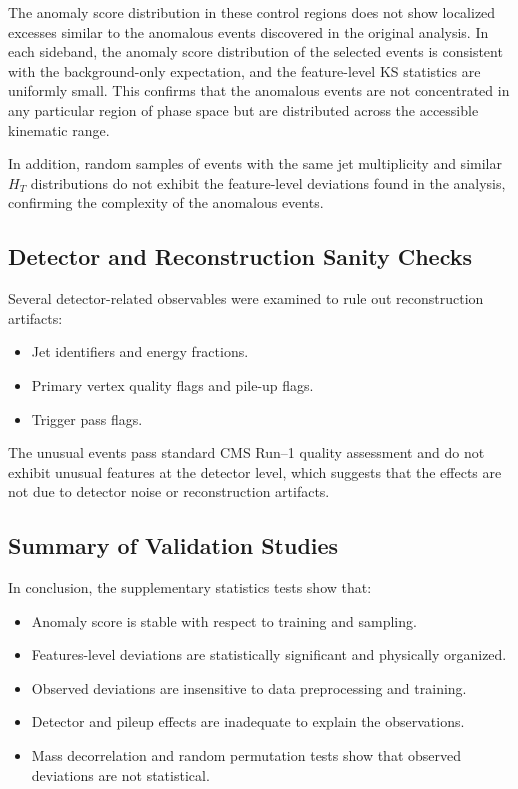 \documentclass[11pt,a4paper,twocolumn]{article}
\begin{document}
The anomaly score distribution in these control regions does not show localized excesses similar to the anomalous events discovered in the original analysis. In each sideband, the anomaly score distribution of the selected events is consistent with the background-only expectation, and the feature-level KS statistics are uniformly small. This confirms that the anomalous events are not concentrated in any particular region of phase space but are distributed across the accessible kinematic range.

In addition, random samples of events with the same jet multiplicity and similar $H_T$ distributions do not exhibit the feature-level deviations found in the analysis, confirming the complexity of the anomalous events.

\subsection{Detector and Reconstruction Sanity Checks}

Several detector-related observables were examined to rule out reconstruction artifacts:

\begin{itemize}
    \item Jet identifiers and energy fractions.
    \item Primary vertex quality flags and pile-up flags.
    \item Trigger pass flags.
\end{itemize}

The unusual events pass standard CMS Run--1 quality assessment and do not exhibit unusual features at the detector level, which suggests that the effects are not due to detector noise or reconstruction artifacts.

\subsection{Summary of Validation Studies}

In conclusion, the supplementary statistics tests show that: 
\begin{itemize}
   \item Anomaly score is stable with respect to training and sampling. 
   \item Features-level deviations are statistically significant and physically organized. 
   \item Observed deviations are insensitive to data preprocessing and training. 
   \item Detector and pileup effects are inadequate to explain the observations. 
   \item Mass decorrelation and random permutation tests show that observed deviations are not statistical. 
\end{itemize}
\end{document}
